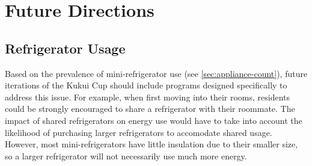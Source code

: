 \section{Future Directions}

\subsection{Refrigerator Usage}

Based on the prevalence of mini-refrigerator use (see \autoref{sec:appliance-count}), future iterations of the Kukui Cup should include programs designed specifically to address this issue. For example, when first moving into their rooms, residents could be strongly encouraged to share a refrigerator with their roommate. The impact of shared refrigerators on energy use would have to take into account the likelihood of purchasing larger refrigerators to accomodate shared usage. However, most mini-refrigerators have little insulation due to their smaller size, so a larger refrigerator will not necessarily use much more energy.

%
